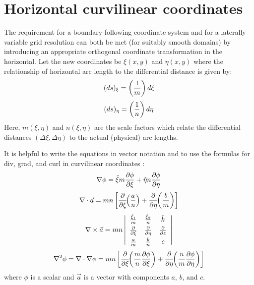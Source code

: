 \section{Horizontal curvilinear coordinates}
\label{Curve}
The requirement for a boundary-following coordinate system and for a
laterally variable grid resolution can both be met (for suitably
smooth domains) by introducing an appropriate orthogonal coordinate
transformation in the horizontal.  Let the new coordinates be
$\xi(x,y)$ and $\eta(x,y)$ where the relationship of horizontal arc
length to the differential distance is given by:
\begin{equation}
   (ds)_{\xi} = \left( {1 \over m} \right) d \xi
\end{equation}
\begin{equation}
   (ds)_{\eta} = \left( {1 \over n} \right) d \eta
\end{equation}
Here, $m(\xi,\eta)$ and $n(\xi,\eta)$ are the scale factors which
relate the differential distances $(\Delta \xi,\Delta \eta)$ to the
actual (physical) arc lengths.

It is helpful to write the equations in vector notation and to use
the formulas for div, grad, and curl in curvilinear coordinates
\citep[see][Appendix 2]{Batchelor}:
\begin{equation}
   \nabla \phi = \hat{\xi} m {\partial \phi \over \partial \xi} +
                 \hat{\eta} n {\partial \phi \over \partial \eta}
\end{equation}
\begin{equation}
   \nabla \cdot \vec{a} = mn \left[
   {\partial \over \partial \xi} \!\! \left( {a \over n} \right) +
   {\partial \over \partial \eta} \!\! \left( {b \over m} \right)
   \right]
\end{equation}
\begin{equation}
   \nabla \times \vec{a} = mn \left| \begin{array}{ccc}
   \vspace{1 mm}
   {\hat{\xi}_1 \over m} & {\hat{\xi}_2 \over n} & \hat{k} \\
   \vspace{1 mm}
   {\partial \over \partial \xi} &
   {\partial \over \partial \eta} &
   {\partial \over \partial z} \\
   {a \over m} & {b \over n} & c
   \end{array} \right|
\end{equation}
\begin{equation}
   \nabla^2 \phi = \nabla \cdot \nabla \phi = mn \left[ 
   {\partial \over \partial \xi} \!\! \left( {m \over n} 
   {\partial \phi \over \partial \xi} \right) +
   {\partial \over \partial \eta} \!\! \left( {n \over m} 
   {\partial \phi \over \partial \eta} \right) \right]
\end{equation}
where $\phi$ is a scalar and $\vec{a}$ is a vector with components
$a$, $b$, and $c$.

